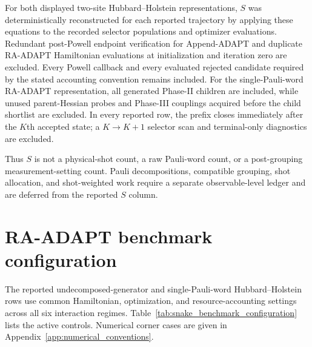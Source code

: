 \documentclass[
  reprint,
  amsmath,
  amssymb,
  aps,
  pra,
  nofootinbib,
  superscriptaddress,
  floatfix
]{revtex4-2}
\begin{document}
For both displayed two-site Hubbard--Holstein representations, \(S\) was
deterministically reconstructed for each reported trajectory by applying these
equations to the recorded selector populations and optimizer evaluations.
Redundant post-Powell endpoint verification for Append-ADAPT and duplicate
RA-ADAPT Hamiltonian evaluations at initialization and iteration zero are
excluded. Every Powell callback and every evaluated rejected candidate
required by the stated accounting convention remains
included. For the single-Pauli-word RA-ADAPT representation, all generated
Phase-II children are included,
while unused parent-Hessian probes and Phase-III couplings acquired before the
child shortlist are excluded. In every reported row, the prefix closes
immediately after the \(K\)th accepted state; a \(K\!\to\!K+1\) selector scan
and terminal-only diagnostics are excluded.

Thus \(S\) is not a physical-shot count, a raw Pauli-word count, or
a post-grouping measurement-setting count. Pauli decompositions, compatible
grouping, shot allocation, and shot-weighted work require a separate
observable-level ledger and are deferred from the reported \(S\) column.

\section{RA-ADAPT benchmark configuration}
\label{app:results_discussion}

The reported undecomposed-generator and single-Pauli-word Hubbard--Holstein rows use common Hamiltonian,
optimization, and resource-accounting settings across all six interaction
regimes. Table~\ref{tab:snake_benchmark_configuration} lists the active
controls. Numerical corner cases are given in
Appendix~\ref{app:numerical_conventions}.
\end{document}
